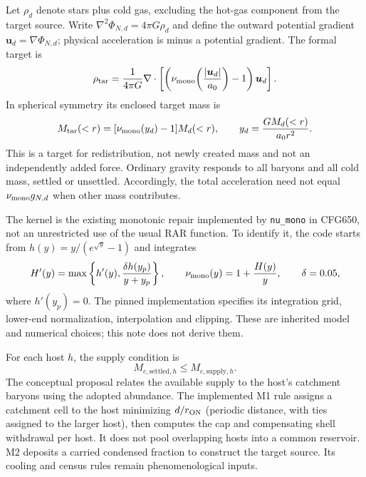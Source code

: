 \documentclass[11pt]{article}
\begin{document}
Let $\rho_d$ denote stars plus cold gas, excluding the hot-gas component from the target source. Write $\nabla^2\Phi_{N,d}=4\pi G\rho_d$ and define the outward potential gradient $\boldsymbol u_d=\nabla\Phi_{N,d}$; physical acceleration is minus a potential gradient. The formal target is
\begin{equation}\label{eq:target}
 \rho_{\rm tar}=\frac{1}{4\pi G}\nabla\cdot
 \left[\left(\nu_{\rm mono}\!\left(\frac{|\boldsymbol u_d|}{a_0}\right)-1\right)\boldsymbol u_d\right].
\end{equation}
In spherical symmetry its enclosed target mass is
\begin{equation}
 M_{\rm tar}(<r)=[\nu_{\rm mono}(y_d)-1]M_d(<r),
 \qquad y_d=\frac{GM_d(<r)}{a_0r^2}.
\end{equation}
This is a target for redistribution, not newly created mass and not an independently added force. Ordinary gravity responds to all baryons and all cold mass, settled or unsettled. Accordingly, the total acceleration need not equal $\nu_{\rm mono}g_{N,d}$ when other mass contributes.

The kernel is the existing monotonic repair implemented by \texttt{nu\_mono} in CFG650, not an unrestricted use of the usual RAR function. To identify it, the code starts from $h(y)=y/(e^{\sqrt y}-1)$ and integrates
\begin{equation}
 H'(y)=\max\left\{h'(y),\frac{\delta h(y_p)}{y+y_p}\right\},
 \qquad \nu_{\rm mono}(y)=1+\frac{H(y)}{y},\qquad \delta=0.05,
\end{equation}
where $h'(y_p)=0$. The pinned implementation specifies its integration grid, lower-end normalization, interpolation and clipping. These are inherited model and numerical choices; this note does not derive them.

For each host $h$, the supply condition is
\begin{equation}
 M_{c,\mathrm{settled},h}\leq M_{c,\mathrm{supply},h}.
\end{equation}
The conceptual proposal relates the available supply to the host's catchment baryons using the adopted abundance. The implemented M1 rule assigns a catchment cell to the host minimizing $d/r_{\rm ON}$ (periodic distance, with ties assigned to the larger host), then computes the cap and compensating shell withdrawal per host. It does not pool overlapping hosts into a common reservoir. M2 deposits a carried condensed fraction to construct the target source. Its cooling and census rules remain phenomenological inputs.
\end{document}
